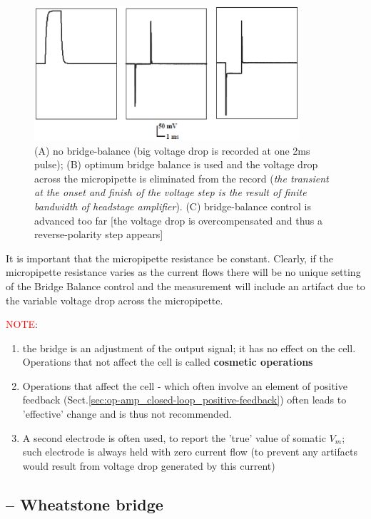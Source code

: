 \begin{figure}[hbt]
  \centerline{\includegraphics[height=5cm,
    angle=0]{./images/bridge-balance.eps}}
  \caption{(A) no bridge-balance (big voltage drop is recorded at one 2ms
  pulse); (B) optimum bridge balance is used and the voltage drop across the micropipette is eliminated from the record
({\it the transient at the onset and finish of the voltage step is the result
of finite bandwidth of headstage amplifier}). (C) bridge-balance control is
advanced too far [the voltage drop is overcompensated and thus a
reverse-polarity step appears]}
  \label{fig:bridge-balance}
\end{figure}

It is important that the micropipette resistance be constant. Clearly, if the micropipette
resistance varies as the current flows there will be no unique setting of the Bridge Balance
control and the measurement will include an artifact due to the variable voltage drop
across the micropipette.

\textcolor{red}{NOTE}:
\begin{enumerate}
  \item the bridge is an adjustment of the output signal; it has no effect on
  the cell. Operations that not affect the cell is called {\bf cosmetic
  operations}

  \item Operations that affect the cell - which often involve an element of
  positive feedback (Sect.\ref{sec:op-amp_closed-loop_positive-feedback})
  often leads to 'effective' change and is thus not recommended.

  \item A second electrode is often used, to report the 'true' value of
  somatic $V_m$; such electrode is always held with zero current flow (to
  prevent any artifacts would result from voltage drop generated by this
  current)
\end{enumerate}

\subsection{-- Wheatstone bridge}
\label{sec:Wheatstone-bridge}

